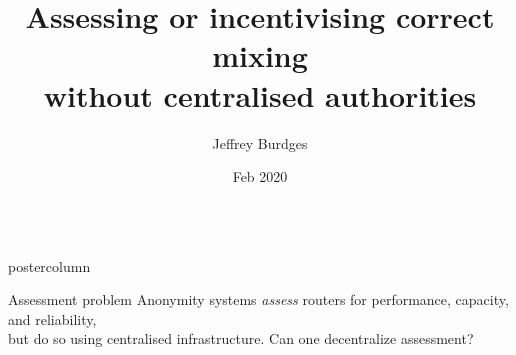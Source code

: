 \documentclass{beamer}
\title{\huge Assessing or incentivising correct mixing \\ without centralised authorities}
\author{Jeffrey Burdges}
\institute[Web 3 Foundation]{Web 3.0 Foundation}
\date[Feb 2020]{Feb 2020}
\newlength{\columnheight}
\begin{document}
\begin{frame}
  \begin{columns}
    \begin{column}{.49\textwidth}
      \begin{beamercolorbox}[center,wd=\textwidth]{postercolumn}
        \begin{minipage}[T]{.95\textwidth}  %
          \parbox[t][\columnheight]{\textwidth}{ %
            \begin{block}{Assessment problem}
                Anonymity systems {\em assess} routers for performance, capacity, and reliability, \\ %
                but do so using centralised infrastructure.  Can one decentralize assessment? \\  \bigskip\bigskip
                

\end{block}}
\end{minipage}
\end{beamercolorbox}
\end{column}
\end{columns}
\end{frame}
\end{document}
